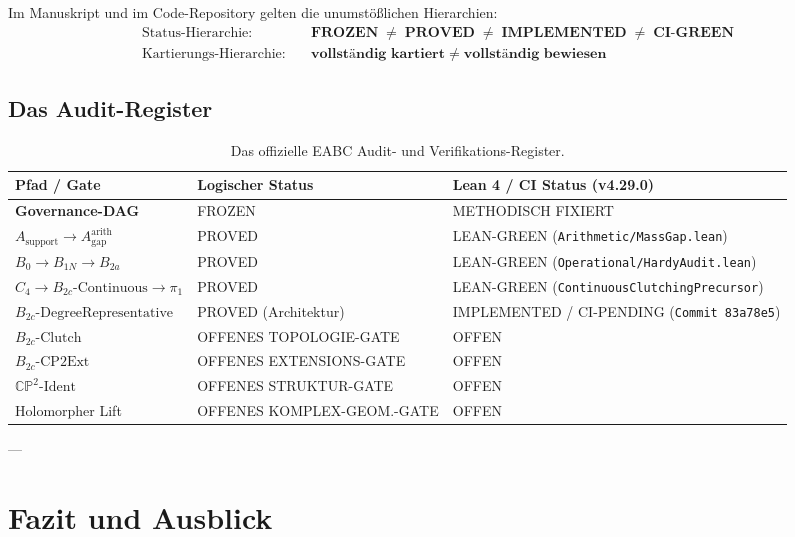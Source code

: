 \documentclass[11pt,a4paper]{article}
\begin{document}
Im Manuskript und im Code-Repository gelten die unumstößlichen Hierarchien:
\begin{align}
\text{Status-Hierarchie:} &\quad \mathbf{\text{FROZEN} \;\neq\; \text{PROVED} \;\neq\; \text{IMPLEMENTED} \;\neq\; \text{CI-GREEN}} \\
\text{Kartierungs-Hierarchie:} &\quad \mathbf{\text{vollständig kartiert} \;\neq\; \text{vollständig bewiesen}}
\end{align}

\subsection{Das Audit-Register}

\begin{table}[h!]
\centering
\small
\begin{tabular}{@{}lll@{}}
\toprule
\textbf{Pfad / Gate} & \textbf{Logischer Status} & \textbf{Lean 4 / CI Status (v4.29.0)} \\ \midrule
\textbf{Governance-DAG} & FROZEN & METHODISCH FIXIERT \\
$A_{\text{support}} \to A_{\text{gap}}^{\text{arith}}$ & PROVED & LEAN-GREEN (\texttt{Arithmetic/MassGap.lean}) \\
$B_0 \to B_{1N} \to B_{2a}$ & PROVED & LEAN-GREEN (\texttt{Operational/HardyAudit.lean}) \\
$C_4 \to B_{2c}\text{-Continuous} \to \pi_1$ & PROVED & LEAN-GREEN (\texttt{ContinuousClutchingPrecursor}) \\
$B_{2c}\text{-DegreeRepresentative}$ & PROVED (Architektur) & IMPLEMENTED / CI-PENDING (\texttt{Commit 83a78e5}) \\
$B_{2c}\text{-Clutch}$ & OFFENES TOPOLOGIE-GATE & OFFEN \\
$B_{2c}\text{-CP2Ext}$ & OFFENES EXTENSIONS-GATE & OFFEN \\
$\mathbb{CP}^2\text{-Ident}$ & OFFENES STRUKTUR-GATE & OFFEN \\
Holomorpher Lift & OFFENES KOMPLEX-GEOM.-GATE & OFFEN \\ \bottomrule
\end{tabular}
\caption{Das offizielle EABC Audit- und Verifikations-Register.}
\end{table}

---

\section{Fazit und Ausblick}
\end{document}
